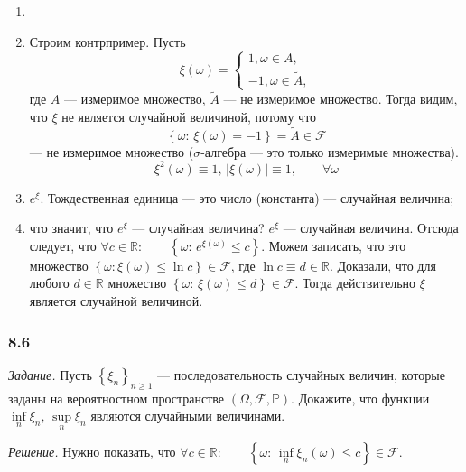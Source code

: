 \begin{enumerate}[label=\alph*)]
\item \item Строим контрпример.
Пусть
$$ \xi \left( \omega \right) =
\begin{cases}
1, \omega \in A, \\
-1, \omega \in \tilde{A},
\end{cases}$$
где $A$ --- измеримое множество, $ \tilde{A} $ --- не измеримое множество.
Тогда видим, что $ \xi $ не является случайной величиной, потому что
$$ \left\{ \omega: \,
\xi \left( \omega \right) =
- 1 \right\} =
\tilde{A} \in
\mathcal{F} $$
--- не измеримое множество ($ \sigma $-алгебра --- это только измеримые множества).
$$ \xi^2 \left( \omega \right) \equiv
1, \,
\left| \xi \left( \omega \right) \right| \equiv
1, \qquad
\forall \omega$$
\item $ e^{ \xi } $.
Тождественная единица --- это число (константа) --- случайная величина;
\item что значит, что $e^{ \xi }$ --- случайная величина?
$e^{ \xi }$ --- случайная величина.
Отсюда следует, что $ \forall c \in \mathbb{R}: \qquad \left\{ \omega: \, e^{ \xi \left( \omega \right) } \leq c \right\} $.
Можем записать, что это множество $ \left\{ \omega: \xi \left( \omega \right) \leq \ln c \right\} \in \mathcal{F} $, где $ \ln c \equiv d \in \mathbb{R} $.
Доказали, что для любого $d \in \mathbb{R} $ множество $ \left\{ \omega: \, \xi \left( \omega \right) \leq d \right\} \in \mathcal{F} $.
Тогда действительно $ \xi $ является случайной величиной. 
\end{enumerate}

\subsubsection*{8.6}

\textit{Задание.}
Пусть $ \left\{ \xi_n \right\}_{n \geq 1} $ ---
последовательность случайных величин, которые заданы на вероятностном пространстве $ \left( \Omega, \mathcal{F}, \mathbb{P} \right) $.
Докажите, что функции $ \inf \limits_{n} \xi_n, \, \sup \limits_{n} \xi_n $ являются случайными величинами.

\textit{Решение.} Нужно показать, что $ \forall c \in \mathbb{R}: \qquad \left\{ \omega: \, \inf \limits_{n} \xi_n \left( \omega \right) \leq c \right\} \in \mathcal{F} $.


